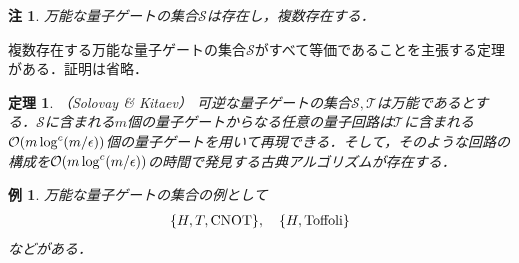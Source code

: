 \documentclass[dvipdfmx]{jarticle}
\numberwithin{equation}{section}
\theoremstyle{seminar}
\newtheorem{theorem}{定理}[section]
\newtheorem{example}{例}[section]
\newtheorem{remark}{注}[section]
\begin{document}
\begin{remark}
  万能な量子ゲートの集合$\mathcal{S}$は存在し，複数存在する．
\end{remark}

複数存在する万能な量子ゲートの集合$\mathcal{S}$がすべて等価であることを主張する定理がある．証明は省略．
\begin{theorem}（Solovay \& Kitaev）
  可逆な量子ゲートの集合$\mathcal{S}, \mathcal{T}$は万能であるとする．$\mathcal{S}$に含まれる$m$個の量子ゲートからなる任意の量子回路は$\mathcal{T}$に含まれる$\mathcal{O}\qty(m \log^c (m / \epsilon))$個の量子ゲートを用いて再現できる．そして，そのような回路の構成を$\mathcal{O}\qty(m \log^c (m / \epsilon))$の時間で発見する古典アルゴリズムが存在する．
\end{theorem}

\begin{example}
  万能な量子ゲートの集合の例として
  \begin{align}
    \qty{H, T, \mathrm{CNOT}}, \quad \qty{H, \mathrm{Toffoli}}
  \end{align}
  などがある．
\end{example}
\end{document}
